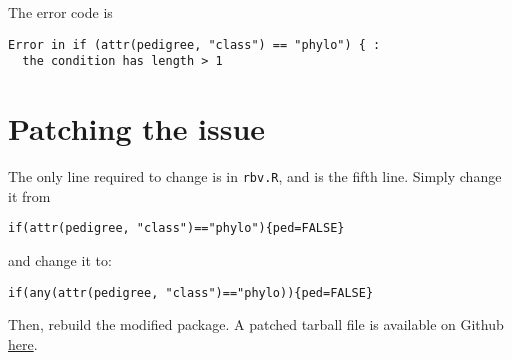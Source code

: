 The error code is

\begin{verbatim}
Error in if (attr(pedigree, "class") == "phylo") { : 
  the condition has length > 1
\end{verbatim}

\hypertarget{patching-the-issue}{%
\section*{Patching the issue}\label{patching-the-issue}}

The only line required to change is in \texttt{rbv.R}, and is the fifth
line. Simply change it from

\begin{verbatim}
if(attr(pedigree, "class")=="phylo"){ped=FALSE}
\end{verbatim}

and change it to:

\begin{verbatim}
if(any(attr(pedigree, "class")=="phylo)){ped=FALSE}
\end{verbatim}

Then, rebuild the modified package. A patched tarball file is available
on Github
\href{https://github.com/frederni/TMA4900-MasterThesis/blob/main/MCMCglmm-rbv-patch.tar.gz}{here}.
